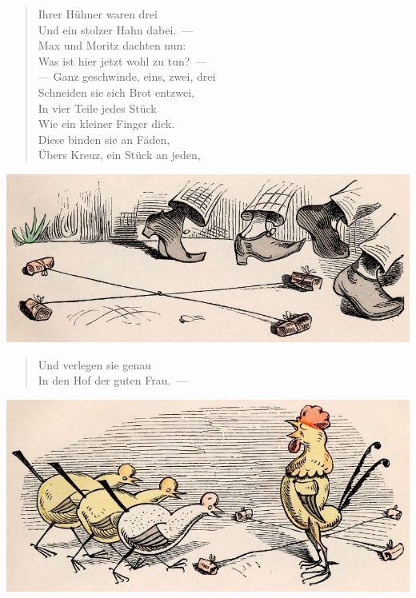 \documentclass[a4paper,12pt]{article}
\begin{document}
\begin{verse}
Ihrer Hühner waren drei\\{}
Und ein stolzer Hahn dabei.~—\\{}
Max und Moritz dachten nun:\\{}
Was ist hier jetzt wohl zu tun?~—\\{}
— Ganz geschwinde, eins, zwei, drei\\{}
Schneiden sie sich Brot entzwei,\\{}
In vier Teile jedes Stück\\{}
Wie ein kleiner Finger dick.\\{}
Diese binden sie an Fäden,\\{}
Übers Kreuz, ein Stück an jeden,
\end{verse}



\begin{center}\includegraphics[scale=.7, alt={Vier Brotstücke}]{images/1-03.jpg}\end{center}



\begin{verse}
Und verlegen sie genau\\{}
In den Hof der guten Frau.~—
\end{verse}



\begin{center}\includegraphics[scale=.7, alt={Da kommen sie}]{images/1-04.jpg}\end{center}
\end{document}
